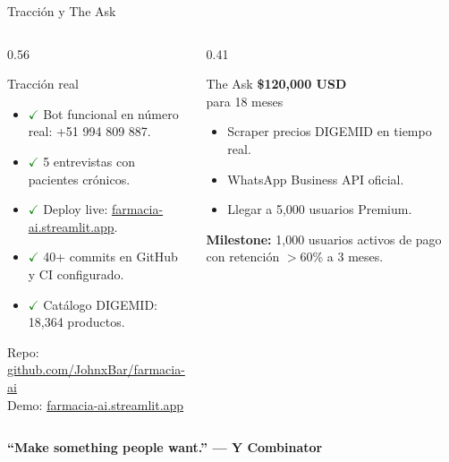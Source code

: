 \documentclass[aspectratio=169,11pt]{beamer}
\newcommand{\tightlist}{\setlength\itemsep{2pt}\setlength\parskip{0pt}\setlength\parsep{0pt}}
\begin{document}
\begin{frame}[t]{Tracción y The Ask}
\vspace{-0.3em}
\begin{columns}[T,onlytextwidth]
\begin{column}{0.56\textwidth}
\begin{block}{Tracción real}
\begin{itemize}\tightlist
  \item \textcolor{Green}{$\checkmark$} Bot funcional en número real: +51 994 809 887.
  \item \textcolor{Green}{$\checkmark$} 5 entrevistas con pacientes crónicos.
  \item \textcolor{Green}{$\checkmark$} Deploy live: \url{farmacia-ai.streamlit.app}.
  \item \textcolor{Green}{$\checkmark$} 40+ commits en GitHub y CI configurado.
  \item \textcolor{Green}{$\checkmark$} Catálogo DIGEMID: 18,364 productos.
\end{itemize}
\end{block}
\vspace{0.2em}
{\scriptsize Repo: \url{github.com/JohnxBar/farmacia-ai}\\ Demo: \url{farmacia-ai.streamlit.app}}
\end{column}
\begin{column}{0.41\textwidth}
\begin{alertblock}{The Ask}
\centering
\Large\textbf{\$120,000 USD}\\[-1pt]
\scriptsize para 18 meses
\vspace{0.25em}
\begin{itemize}\tightlist
  \item Scraper precios DIGEMID en tiempo real.
  \item WhatsApp Business API oficial.
  \item Llegar a 5,000 usuarios Premium.
\end{itemize}
\vspace{0.25em}
\textbf{Milestone:} 1,000 usuarios activos de pago con retención $>$60\% a 3 meses.
\end{alertblock}
\end{column}
\end{columns}
\vfill
\centering
{\small\bfseries ``Make something people want.'' — Y Combinator}
\end{frame}
\end{document}
